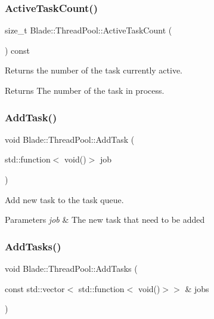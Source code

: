 \subsubsection{\texorpdfstring{Active\+Task\+Count()}{ActiveTaskCount()}}
{\footnotesize\ttfamily size\+\_\+t Blade\+::\+Thread\+Pool\+::\+Active\+Task\+Count (\begin{DoxyParamCaption}{ }\end{DoxyParamCaption}) const}



Returns the number of the task currently active. 

\begin{DoxyReturn}{Returns}
The number of the task in process. 
\end{DoxyReturn}
\mbox{\label{class_blade_1_1_thread_pool_acc1d6c39383a95582641b5b34d44040c}} 
\subsubsection{\texorpdfstring{Add\+Task()}{AddTask()}}
{\footnotesize\ttfamily void Blade\+::\+Thread\+Pool\+::\+Add\+Task (\begin{DoxyParamCaption}\item[{std\+::function$<$ void()$>$}]{job }\end{DoxyParamCaption})}



Add new task to the task queue. 


\begin{DoxyParams}{Parameters}
{\em job} & The new task that need to be added \\
\hline
\end{DoxyParams}
\mbox{\label{class_blade_1_1_thread_pool_acacbc26ec4bf163a12b5005c3d1fd0c5}} 
\subsubsection{\texorpdfstring{Add\+Tasks()}{AddTasks()}}
{\footnotesize\ttfamily void Blade\+::\+Thread\+Pool\+::\+Add\+Tasks (\begin{DoxyParamCaption}\item[{const std\+::vector$<$ std\+::function$<$ void()$>$$>$ \&}]{jobs }\end{DoxyParamCaption})}



